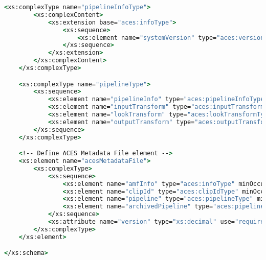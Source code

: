 \begin{lstlisting}[language=csh]
	<xs:complexType name="pipelineInfoType">
		<xs:complexContent>
			<xs:extension base="aces:infoType">
				<xs:sequence>
					<xs:element name="systemVersion" type="aces:versionType" minOccurs="1" maxOccurs="1"/>
				</xs:sequence>
			</xs:extension>
		</xs:complexContent>
	</xs:complexType>

	<xs:complexType name="pipelineType">
		<xs:sequence>
			<xs:element name="pipelineInfo" type="aces:pipelineInfoType" minOccurs="1" maxOccurs="1"/>
			<xs:element name="inputTransform" type="aces:inputTransformType" minOccurs="0" maxOccurs="1"/>
			<xs:element name="lookTransform" type="aces:lookTransformType" minOccurs="0" maxOccurs="unbounded" />
			<xs:element name="outputTransform" type="aces:outputTransformType" minOccurs="1" maxOccurs="1"/>
		</xs:sequence>
	</xs:complexType>

	<!-- Define ACES Metadata File element -->
	<xs:element name="acesMetadataFile">
		<xs:complexType>
			<xs:sequence>
				<xs:element name="amfInfo" type="aces:infoType" minOccurs="1" maxOccurs="1"/>
				<xs:element name="clipId" type="aces:clipIdType" minOccurs="0" maxOccurs="1"/>
				<xs:element name="pipeline" type="aces:pipelineType" minOccurs="1" maxOccurs="1"/>
				<xs:element name="archivedPipeline" type="aces:pipelineType" minOccurs="0" maxOccurs="unbounded"/>
			</xs:sequence>
			<xs:attribute name="version" type="xs:decimal" use="required" fixed="1.0"/>
		</xs:complexType>
	</xs:element>

</xs:schema>

\end{lstlisting}
